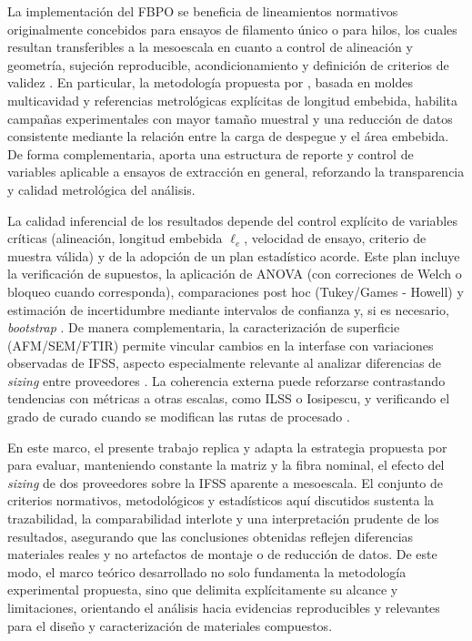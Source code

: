 La implementación del FBPO se beneficia de lineamientos normativos originalmente concebidos para
ensayos de filamento único o para hilos, los cuales resultan transferibles a la mesoescala en cuanto
a control de alineación y geometría, sujeción reproducible, acondicionamiento y definición de
criterios de validez \cite{ISO19375,DINSPEC19289,ISO3341,DIN29965}. En particular, la metodología
propuesta por \cite{DeLeon2022}, basada en moldes multicavidad y referencias metrológicas explícitas
de longitud embebida, habilita campañas experimentales con mayor tamaño muestral y una reducción de
datos consistente mediante la relación entre la carga de despegue y el área embebida. De forma
complementaria, \cite{ASTMD4475} aporta una estructura de reporte y control de variables aplicable a
ensayos de extracción en general, reforzando la transparencia y calidad metrológica del análisis.

La calidad inferencial de los resultados depende del control explícito de variables críticas
(alineación, longitud embebida \(\ell_e\), velocidad de ensayo, criterio de muestra válida) y
de la adopción de un plan estadístico acorde. Este plan incluye la
verificación de supuestos, la aplicación de ANOVA (con correciones de Welch o bloqueo cuando corresponda),
comparaciones post hoc (Tukey/Games - Howell) y estimación de incertidumbre mediante intervalos de confianza
y, si es necesario, \emph{bootstrap} \cite{Fischer2020,Liu2021}. De manera complementaria, la caracterización
de superficie (AFM/SEM/FTIR) permite vincular cambios en la interfase con variaciones observadas de IFSS,
aspecto especialmente relevante al analizar diferencias de \textit{sizing} entre proveedores
\cite{AhmadvashAghbash2024IMR}. La coherencia externa puede reforzarse contrastando tendencias con
métricas a otras escalas, como ILSS o Iosipescu, y verificando el grado de curado cuando se
modifican las rutas de procesado \cite{Zhou2016}.

En este marco, el presente trabajo replica y adapta la estrategia propuesta por \cite{DeLeon2022}
para evaluar, manteniendo constante la matriz y la fibra nominal, el efecto del \textit{sizing} de
dos proveedores sobre la IFSS aparente a mesoescala. El conjunto de criterios normativos,
metodológicos y estadísticos aquí discutidos sustenta la trazabilidad, la comparabilidad interlote y
una interpretación prudente de los resultados, asegurando que las conclusiones obtenidas reflejen
diferencias materiales reales y no artefactos de montaje o de reducción de datos. De este modo, el
marco teórico desarrollado no solo fundamenta la metodología experimental propuesta, sino que
delimita explícitamente su alcance y limitaciones, orientando el análisis hacia evidencias
reproducibles y relevantes para el diseño y caracterización de materiales compuestos.